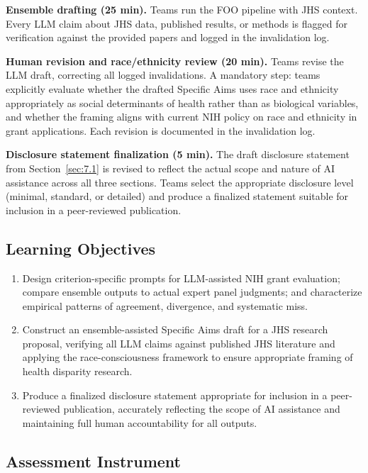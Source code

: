 \textbf{Ensemble drafting (25 min).} Teams run the FOO pipeline
with JHS context. Every LLM claim about JHS data, published
results, or methods is flagged for verification against the
provided papers and logged in the invalidation log.

\textbf{Human revision and race/ethnicity review (20 min).}
Teams revise the LLM draft, correcting all logged invalidations.
A mandatory step: teams explicitly evaluate whether the drafted
Specific Aims uses race and ethnicity appropriately as social
determinants of health rather than as biological variables, and
whether the framing aligns with current NIH policy on race
and ethnicity in grant applications. Each revision is documented
in the invalidation log.

\textbf{Disclosure statement finalization (5 min).} The draft
disclosure statement from Section~\ref{sec:7.1} is revised to
reflect the actual scope and nature of AI assistance across all
three sections. Teams select the appropriate disclosure level
(minimal, standard, or detailed) and produce a finalized
statement suitable for inclusion in a peer-reviewed publication.

\subsection{Learning Objectives}

\begin{enumerate}
    \item Design criterion-specific prompts for LLM-assisted NIH
    grant evaluation; compare ensemble outputs to actual expert
    panel judgments; and characterize empirical patterns of
    agreement, divergence, and systematic miss.

    \item Construct an ensemble-assisted Specific Aims draft for
    a JHS research proposal, verifying all LLM claims against
    published JHS literature and applying the race-consciousness
    framework to ensure appropriate framing of health disparity
    research.

    \item Produce a finalized disclosure statement appropriate for
    inclusion in a peer-reviewed publication, accurately reflecting
    the scope of AI assistance and maintaining full human
    accountability for all outputs.
\end{enumerate}

\subsection{Assessment Instrument}

